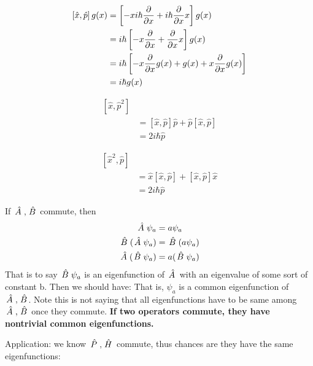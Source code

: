 \documentclass{school-22.101-notes}
\begin{document}
\begin{align}
\left[ \hat{x} ,\hat{p} \right] g(x) &= \left[ -x i \hbar \frac{\partial}{\partial x} + i \hbar \frac{\partial}{\partial x} x   \right] g(x) \\
&= i \hbar \left[ -x \frac{\partial}{\partial x} + \frac{\partial}{\partial x} x \right] g(x) \\
&= i \hbar \left[ -x \frac{\partial}{\partial x} g(x) + g(x) + x \frac{\partial}{\partial x} g(x) \right] \\
&= i \hbar g(x)
\end{align}

\begin{align}
\left[ \hat{x} ,\hat{p}^2 \right] \\
&= \left[ \hat{x} ,\hat{p} \right] \hat{p} + \hat{p} \left[ \hat{x} ,\hat{p} \right] \\
&= 2 i \hbar \hat{p}
\end{align}


\begin{align}
\left[ \hat{x}^2,\hat{p} \right] \\
&= \hat{x} \left[ \hat{x} ,\hat{p} \right]  + \left[ \hat{x} ,\hat{p} \right] \hat{x} \\
&= 2 i \hbar \hat{p}
\end{align}

If $\left. \hat{A} \right., \left. \hat{B} \right.$ commute, then
\begin{align}
\left. \hat{A} \right. \psi_a &= a \psi_a \\
\left. \hat{B} \right. ( \left. \hat{A} \right. \psi_a) &= \left. \hat{B} \right. (a \psi_a ) \\
\left. \hat{A} \right. (\left. \hat{B} \right. \psi_a ) &= a (\left. \hat{B} \right. \psi_a ) 
\end{align}
That is to say $\left. \hat{B} \right. \psi_a$ is an eigenfunction of $\left. \hat{A} \right.$ with an eigenvalue of some sort of constant b. Then we should have:
That is, $\psi_a$ is a common eigenfunction of $\left. \hat{A} \right., \left. \hat{B} \right.$. Note this is not saying that all eigenfunctions have to be same among $\left. \hat{A} \right., \left. \hat{B} \right.$ once they commute. \textbf{If two operators commute, they have nontrivial common eigenfunctions.}

Application: we know $\left. \hat{P} \right., \left. \hat{H} \right.$ commute, thus chances are they have the same eigenfunctions:
\end{document}
